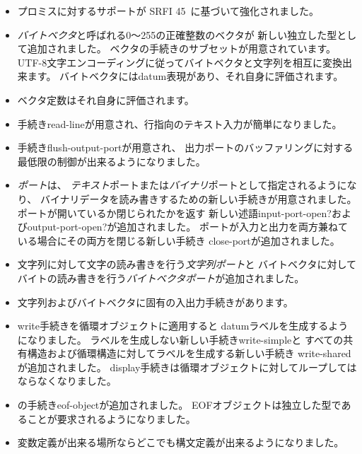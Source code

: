 \begin{itemize}
\item プロミスに対するサポートが
SRFI 45~\cite{srfi45}に基づいて強化されました。

\item {\em バイトベクタ}と呼ばれる0〜255の正確整数のベクタが
新しい独立した型として追加されました。
ベクタの手続きのサブセットが用意されています。
UTF-8文字エンコーディングに従ってバイトベクタと文字列を相互に変換出来ます。
バイトベクタにはdatum表現があり、それ自身に評価されます。

\item ベクタ定数はそれ自身に評価されます。

\item 手続き{\cf read-line}が用意され、行指向のテキスト入力が簡単になりました。

\item 手続き{\cf flush-output-port}が用意され、
出力ポートのバッファリングに対する最低限の制御が出来るようになりました。

\item {\em ポート}は、
{\em テキスト}ポートまたは{\em バイナリ}ポートとして指定されるようになり、
バイナリデータを読み書きするための新しい手続きが用意されました。
ポートが開いているか閉じられたかを返す
新しい述語{\cf input-port-open?}および{\cf output-port-open?}が追加されました。
ポートが入力と出力を両方兼ねている場合にその両方を閉じる新しい手続き
{\cf close-port}が追加されました。

\item 文字列に対して文字の読み書きを行う{\em 文字列ポート}と
バイトベクタに対してバイトの読み書きを行う{\em バイトベクタポート}が追加されました。

\item 文字列およびバイトベクタに固有の入出力手続きがあります。

\item {\cf write}手続きを循環オブジェクトに適用すると
datumラベルを生成するようになりました。
ラベルを生成しない新しい手続き{\cf write-simple}と
すべての共有構造および循環構造に対してラベルを生成する新しい手続き
{\cf write-shared}が追加されました。
{\cf display}手続きは循環オブジェクトに対してループしてはならなくなりました。

\item \rsixrs の手続き{\cf eof-object}が追加されました。
EOFオブジェクトは独立した型であることが要求されるようになりました。

\item 変数定義が出来る場所ならどこでも構文定義が出来るようになりました。


\end{itemize}
